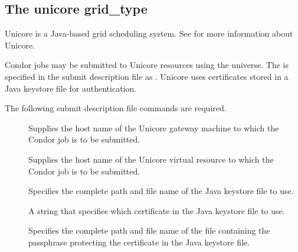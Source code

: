 
\subsection{\label{sec:Unicore}The unicore grid\_type }

Unicore is a Java-based grid scheduling system.
See  for more information about Unicore.

Condor jobs may be submitted to
Unicore resources using the  universe.
The  is specified in the submit description
file as .
Unicore uses certificates stored in a Java keystore file for
authentication. 

The following submit description file commands
are required.

\begin{description}
\item[]
  Supplies the host name of the Unicore gateway machine to which
  the Condor job is to be submitted.
\item[]
  Supplies the host name of the Unicore virtual resource to which
  the Condor job is to be submitted.
\item[] 
  Specifies the complete path and file name of the Java keystore file to use. 
\item[] 
  A string that specifies which certificate in the
  Java keystore file to use. 
\item[]
  Specifies the complete path and file name of the 
  file containing the passphrase protecting the certificate in the  
  Java keystore file.
\end{description}
